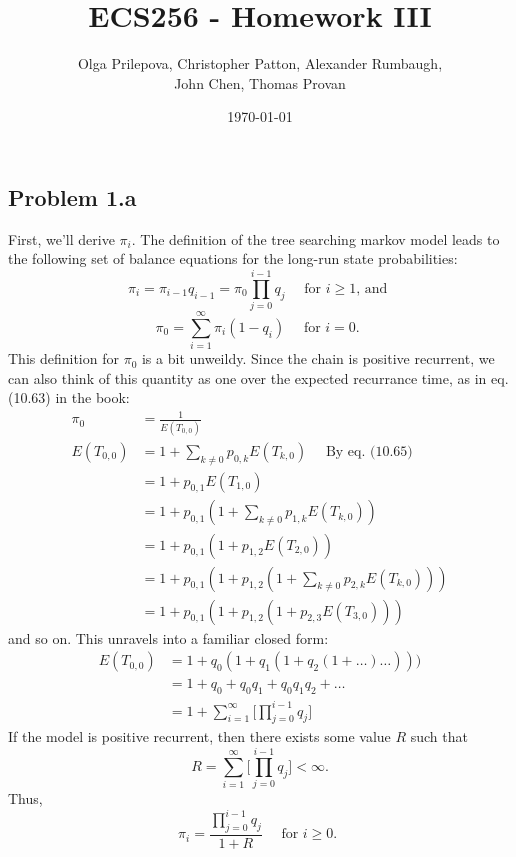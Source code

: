 \documentclass[letter]{article}
\author{Olga Prilepova, Christopher Patton, Alexander Rumbaugh, \\ John Chen, Thomas Provan}
\date{\today}
\title{ECS256 - Homework III}
\begin{document}
\maketitle

\subsection*{Problem 1.a}
First, we'll derive $\pi_i$. The definition of the tree searching markov model leads to the 
following set of balance equations for the long-run state probabilities: 
$$ \pi_i = \pi_{i-1}q_{i-1} = \pi_0 \prod_{j=0}^{i-1}{q_j} \quad \text{ for $i\ge 1$, and } $$
$$ \pi_0 = \sum_{i=1}^\infty{\pi_i(1-q_i)} \quad \text{ for $i=0$. } $$ 
This definition for $\pi_0$ is a bit unweildy. Since the chain is positive recurrent, we can 
also think of this quantity as one over the expected recurrance time, as in eq. (10.63) in 
the book: 
\begin{equation*}
  \begin{aligned}
         \pi_0 &= \frac{1}{E(T_{0,0})} \\  
    E(T_{0,0}) &= 1 + \sum_{k \ne 0}{p_{0,k}E(T_{k,0})} \quad \text{ By eq. (10.65)} \\
               &= 1 + p_{0,1}E(T_{1,0}) \\
               &= 1 + p_{0,1}(1 + \sum_{k \ne 0}{p_{1,k}E(T_{k,0})}) \\ 
               &= 1 + p_{0,1}(1 + p_{1,2}E(T_{2,0})) \\
               &= 1 + p_{0,1}(1 + p_{1,2}(1 + \sum_{k \ne 0}{p_{2,k}E(T_{k,0})})) \\
               &= 1 + p_{0,1}(1 + p_{1,2}(1 + p_{2,3}E(T_{3,0}))) 
  \end{aligned}
\end{equation*}
and so on. This unravels into a familiar closed form:   
\begin{equation*}
  \begin{aligned}
      E(T_{0,0}) &= 1 + q_0(1 + q_1(1 + q_2(1 + \dots ) \dots ))) \\ 
                 &= 1 + q_0 + q_0q_1 + q_0q_1q_2 + \dots \\
                 &= 1 + \sum_{i=1}^\infty{\big[\prod_{j=0}^{i-1}{q_j}\big]}
  \end{aligned}
\end{equation*}
If the model is positive recurrent, then there exists some value $R$ such that
$$ R = \sum_{i=1}^\infty{\big[\prod_{j=0}^{i-1}{q_j}\big]} < \infty. $$
Thus, 
$$ \pi_i = \frac{\prod_{j=0}^{i-1}{q_j}}{1 + R} \quad \text{ for $i \ge 0$. } $$
\end{document}
